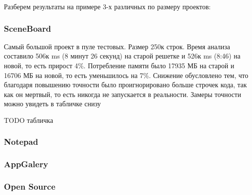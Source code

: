 Разберем результаты на примере 3-х различных по размеру проектов:

\subsubsection*{SceneBoard}
Самый большой проект в пуле тестовых. Размер 250к строк. Время анализа составило 506к ms (8 минут 26 секунд) на старой решетке и 526к ms (8:46) на новой, то есть прирост 4\%. Потребление памяти было 17935 МБ на старой и 16706 МБ на новой, то есть уменьшилось на 7\%. Снижение обусловлено тем, что благодаря повышению точности было проигнорировано больше строчек кода, так как он мертвый, то есть никогда не запускается в реальности. Замеры точности можно увидеть в табличке снизу

TODO табличка

\subsubsection*{Notepad}

\subsubsection*{AppGalery}

\subsubsection*{Open Source}
